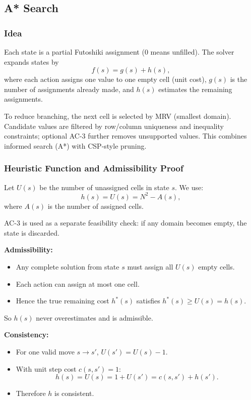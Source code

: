 \subsection{A* Search}
\subsubsection{Idea}
Each state is a partial Futoshiki assignment (\(0\) means unfilled). The solver expands states by
\[
f(s) = g(s) + h(s),
\]
where each action assigns one value to one empty cell (unit cost), \(g(s)\) is the number of assignments already made, and \(h(s)\) estimates the remaining assignments.

To reduce branching, the next cell is selected by MRV (smallest domain). Candidate values are filtered by row/column uniqueness and inequality constraints; optional AC-3 further removes unsupported values. This combines informed search (A*) with CSP-style pruning.

\subsubsection{Heuristic Function and Admissibility Proof}
Let \(U(s)\) be the number of unassigned cells in state \(s\). We use:
\[
h(s)=U(s)=N^2-A(s),
\]
where \(A(s)\) is the number of assigned cells.

AC-3 is used as a separate feasibility check: if any domain becomes empty, the state is discarded.

\textbf{Admissibility:}
\begin{itemize}
\item Any complete solution from state \(s\) must assign all \(U(s)\) empty cells.
\item Each action can assign at most one cell.
\item Hence the true remaining cost \(h^*(s)\) satisfies \(h^*(s) \ge U(s)=h(s)\).
\end{itemize}
So \(h(s)\) never overestimates and is admissible.

\textbf{Consistency:}
\begin{itemize}
\item For one valid move \(s\rightarrow s'\), \(U(s')=U(s)-1\).
\item With unit step cost \(c(s,s')=1\):
\[
h(s)=U(s)=1+U(s')=c(s,s')+h(s').
\]
\item Therefore \(h\) is consistent.
\end{itemize}

